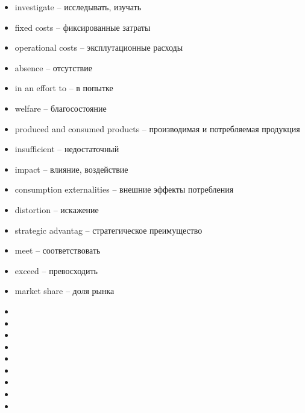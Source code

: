 \begin{itemize}
    \item investigate -- исследывать, изучать
    \item fixed costs -- фиксированные затраты
    \item operational costs -- эксплутационные расходы
    \item absence -- отсутствие 
    \item in an effort to -- в попытке 
    \item welfare -- благосостояние
    \item produced and consumed products -- производимая и потребляемая продукция
    \item insufficient -- недостаточный
    \item impact -- влияние, воздействие
    \item consumption externalities -- внешние эффекты потребления
    \item distortion -- искажение
    \item strategic advantag -- стратегическое преимущество
    \item meet -- соответствовать 
    \item exceed -- превосходить 
    \item market share -- доля рынка
    \item 
    \item 
    \item 
    \item 
    \item 
    \item 
    \item 
    \item 
    \item 
    
    
  \end{itemize}